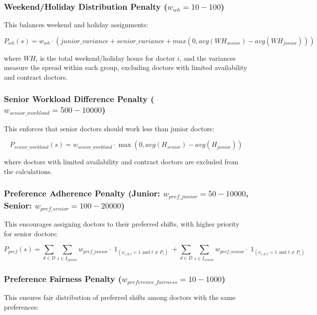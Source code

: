 \documentclass[12pt]{article}
\DeclareMathOperator{\ind}{1}
\begin{document}
\subsubsection{Weekend/Holiday Distribution Penalty ($w_{wh} = 10-100$)}
This balances weekend and holiday assignments:

\begin{equation}
P_{wh}(s) = w_{wh} \cdot (junior\_variance + senior\_variance + max(0, avg(WH_{senior}) - avg(WH_{junior})))
\end{equation}

where $WH_i$ is the total weekend/holiday hours for doctor $i$, and the variances measure the spread within each group, excluding doctors with limited availability and contract doctors.

\subsubsection{Senior Workload Difference Penalty ($w_{senior\_workload} = 500-10000$)}
This enforces that senior doctors should work less than junior doctors:

\begin{equation}
P_{senior\_workload}(s) = w_{senior\_workload} \cdot \max(0, avg(H_{senior}) - avg(H_{junior}))
\end{equation}

where doctors with limited availability and contract doctors are excluded from the calculations.

\subsubsection{Preference Adherence Penalty (Junior: $w_{pref\_junior} = 50-10000$, Senior: $w_{pref\_senior} = 100-20000$)}
This encourages assigning doctors to their preferred shifts, with higher priority for senior doctors:

\begin{equation}
P_{pref}(s) = \sum_{d \in D} \sum_{i \in I_{junior}} w_{pref\_junior} \cdot \ind_{(x_{i,d,t}=1 \text{ and } t \neq P_i)} + \sum_{d \in D} \sum_{i \in I_{senior}} w_{pref\_senior} \cdot \ind_{(x_{i,d,t}=1 \text{ and } t \neq P_i)}
\end{equation}

\subsubsection{Preference Fairness Penalty ($w_{preference\_fairness} = 10-1000$)}
This ensures fair distribution of preferred shifts among doctors with the same preferences:
\end{document}
